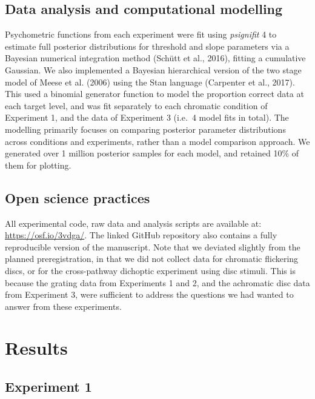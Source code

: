\documentclass[
]{article}
\begin{document}
\hypertarget{data-analysis-and-computational-modelling}{%
\subsection{Data analysis and computational modelling}\label{data-analysis-and-computational-modelling}}

Psychometric functions from each experiment were fit using \emph{psignifit} 4 to estimate full posterior distributions for threshold and slope parameters via a Bayesian numerical integration method (Schütt et al., 2016), fitting a cumulative Gaussian. We also implemented a Bayesian hierarchical version of the two stage model of Meese et al. (2006) using the Stan language (Carpenter et al., 2017). This used a binomial generator function to model the proportion correct data at each target level, and was fit separately to each chromatic condition of Experiment 1, and the data of Experiment 3 (i.e.~4 model fits in total). The modelling primarily focuses on comparing posterior parameter distributions across conditions and experiments, rather than a model comparison approach. We generated over 1 million posterior samples for each model, and retained 10\% of them for plotting.

\hypertarget{open-science-practices}{%
\subsection{Open science practices}\label{open-science-practices}}

All experimental code, raw data and analysis scripts are available at: \url{https://osf.io/3vdga/}. The linked GitHub repository also contains a fully reproducible version of the manuscript. Note that we deviated slightly from the planned preregistration, in that we did not collect data for chromatic flickering discs, or for the cross-pathway dichoptic experiment using disc stimuli. This is because the grating data from Experiments 1 and 2, and the achromatic disc data from Experiment 3, were sufficient to address the questions we had wanted to answer from these experiments.

\hypertarget{results}{%
\section{Results}\label{results}}

\hypertarget{experiment-1}{%
\subsection{Experiment 1}\label{experiment-1}}
\end{document}

